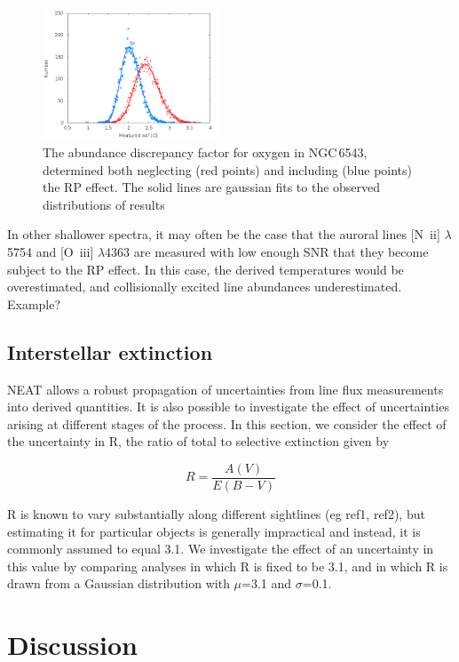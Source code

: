 \documentclass[useAMS,usenatbib]{mn2e}
\begin{document}
\begin{figure}
\label{RPeffect}
\includegraphics[width=0.47\textwidth]{figures/RPeffect.png}
\caption{The abundance discrepancy factor for oxygen in NGC\,6543, determined both neglecting (red points) and including (blue points) the RP effect.  The solid lines are gaussian fits to the observed distributions of results}
\end{figure}

In other shallower spectra, it may often be the case that the auroral lines [N~{\sc ii}] $\lambda$5754 and [O~{\sc iii}] $\lambda$4363 are measured with low enough SNR that they become subject to the RP effect.  In this case, the derived temperatures would be overestimated, and collisionally excited line abundances underestimated.  Example?

\subsection{Interstellar extinction}
\label{extinction}

NEAT allows a robust propagation of uncertainties from line flux measurements into derived quantities.  It is also possible to investigate the effect of uncertainties arising at different stages of the process.  In this section, we consider the effect of the uncertainty in R, the ratio of total to selective extinction given by

\begin{equation}
R = \frac{A(V)}{E(B-V)}
\end{equation}

R is known to vary substantially along different sightlines (eg ref1, ref2), but estimating it for particular objects is generally impractical and instead, it is commonly assumed to equal 3.1.  We investigate the effect of an uncertainty in this value by comparing analyses in which R is fixed to be 3.1, and in which R is drawn from a Gaussian distribution with $\mu$=3.1 and $\sigma$=0.1.

\section{Discussion}
\end{document}
